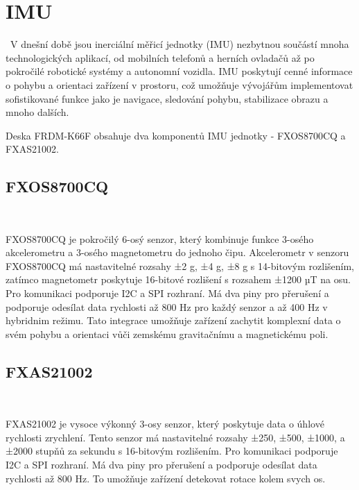 \section{IMU}
\label{sec:IMU}\
V dnešní době jsou inerciální měřicí jednotky (IMU)
nezbytnou součástí mnoha technologických aplikací,
od mobilních telefonů a herních ovladačů až po pokročilé robotické systémy
a autonomní vozidla. IMU poskytují cenné informace o pohybu
a orientaci zařízení v prostoru, což umožňuje vývojářům implementovat
sofistikované funkce jako je navigace, sledování pohybu, stabilizace obrazu a mnoho dalších.

Deska FRDM-K66F obsahuje dva komponentů IMU jednotky - FXOS8700CQ a FXAS21002.\cite{frdmk66UserGuide}

\subsection{FXOS8700CQ}\

FXOS8700CQ je pokročilý 6-osý senzor, který kombinuje funkce 3-osého akcelerometru
a 3-osého magnetometru do jednoho čipu. Akcelerometr v senzoru FXOS8700CQ má
nastavitelné rozsahy ±2 g, ±4 g, ±8 g s 14-bitovým rozlišením, zatímco magnetometr
poskytuje 16-bitové rozlišení s rozsahem ±1200 µT na osu. Pro komunikaci podporuje
I2C a SPI rozhraní. Má dva piny pro přerušení a podporuje odesílat data rychlosti
až 800 Hz pro každý senzor a až 400 Hz v hybridnim režimu.
Tato integrace umožňuje zařízení zachytit komplexní data o svém pohybu a
orientaci vůči zemskému gravitačnímu a magnetickému poli.\cite{FXOS8700CQ}

\subsection{FXAS21002}\

FXAS21002 je vysoce výkonný 3-osy senzor, který poskytuje data o úhlové rychlosti
zrychlení. Tento senzor má nastavitelné rozsahy ±250, ±500, ±1000, a ±2000 stupňů za sekundu
s 16-bitovým rozlišením. Pro komunikaci podporuje I2C a SPI rozhraní.
Má dva piny pro přerušení a podporuje odesílat data rychlosti až 800 Hz.
To umožňuje zařízení detekovat rotace kolem svych os.\cite{FXAS21002}

\endinput
